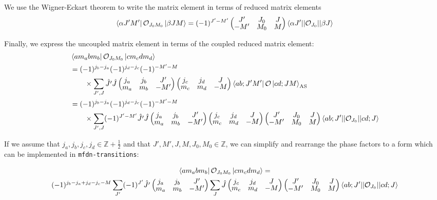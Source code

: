 \documentclass[%
  aps,%
  prc,%
  showpacs,%
  superscriptaddress,%
  onecolumn,%
  notitlepage,%
  12pt,%
  floatfix,%
  amsmath,%
  amssymb,%
]{revtex4-1}
\newcommand{\threej}[6]{
  \renewcommand\arraystretch{0.6667}\begin{pmatrix} #1&#3&#5\\#2&#4&#6 \end{pmatrix}\renewcommand\arraystretch{1}
}
\begin{document}
We use the Wigner-Eckart theorem to write the matrix element in terms of reduced matrix elements
\begin{equation*}
  \bra{\alpha J' M'}\mathcal{O}_{J_0 M_0}\ket{\beta J M}
    = (-1)^{J'-M'}\threej{J'}{-M'}{J_0}{M_0}{J}{M} \langle{\alpha J'}\vert\vert\mathcal{O}_{J_0}\vert\vert{\beta J}\rangle
\end{equation*}


Finally, we express the uncoupled matrix element in terms of the coupled reduced matrix element:
\begin{align*}
  & \bra{a m_a b m_b}\mathcal{O}_{J_0 M_0}\ket{c m_c d m_d} \\
  &= (-1)^{j_b -j_a} (-1)^{j_d-j_c} (-1)^{-M'-M} \\
    &\qquad \times \sum_{J',J} \hat{J'} \hat{J} \threej{j_a}{m_a}{j_b}{m_b}{J'}{-M'}
      \threej{j_c}{m_c}{j_d}{m_d}{J}{-M} \bra{ab;J'M'}\mathcal{O}\ket{cd;JM}_\mathrm{AS}\\
  &= (-1)^{j_b -j_a} (-1)^{j_d-j_c} (-1)^{-M'-M} \\
    &\qquad \times \sum_{J',J} (-1)^{J'-M'} \hat{J'} \hat{J} \threej{j_a}{m_a}{j_b}{m_b}{J'}{-M'}
      \threej{j_c}{m_c}{j_d}{m_d}{J}{-M} \threej{J'}{-M'}{J_0}{M_0}{J}{M} \langle{ab; J'}\vert\vert\mathcal{O}_{J_0}\vert\vert{cd; J}\rangle\\
\end{align*}

If we assume that $j_a,j_b,j_c,j_d \in \mathbb{Z}+\frac{1}{2}$ and that
$J',M',J,M,J_0,M_0 \in \mathbb{Z}$, we can simplify and rearrange the phase
factors to a form which can be implemented in \texttt{mfdn-transitions}:

\begin{multline}
  \bra{a m_a b m_b}\mathcal{O}_{J_0 M_0}\ket{c m_c d m_d} = \\
  (-1)^{j_b-j_a + j_d-j_c - M}
  \sum_{J'} (-1)^{J'} \hat{J'} \threej{j_a}{m_a}{j_b}{m_b}{J'}{-M'}
  \sum_{J} \hat{J} \threej{j_c}{m_c}{j_d}{m_d}{J}{-M} \threej{J'}{-M'}{J_0}{M_0}{J}{M} \langle{ab; J'}\vert\vert\mathcal{O}_{J_0}\vert\vert{cd; J}\rangle
\end{multline}
% 

\end{document}
